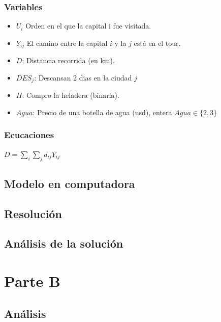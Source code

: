 \documentclass[a4paper]{article}
\begin{document}
\subsubsection{Variables}
\begin{itemize}
	\item $U_{i}$ Orden en el que la capital i fue visitada.

	\item $Y_{ij}$ El camino entre la capital $i$ y la $j$ está en el tour.
	\item $D$: Distancia recorrida (en km).
	\item $DES_j$: Descansan 2 dias en la ciudad $j$
	\item $H$: Compro la heladera (binaria).
	\item $Agua$: Precio de una botella de agua (usd), entera $Agua \in \{2,3\}$

\end{itemize}

\subsubsection{Ecucaciones}

$ D = \sum_{i}\sum_{j} d_{ij} Y_{ij}$


\subsection{Modelo en computadora}
\subsection{Resolución}

\subsection{Análisis de la solución}

\newpage
\section{Parte B}

\subsection{Análisis}
\end{document}
